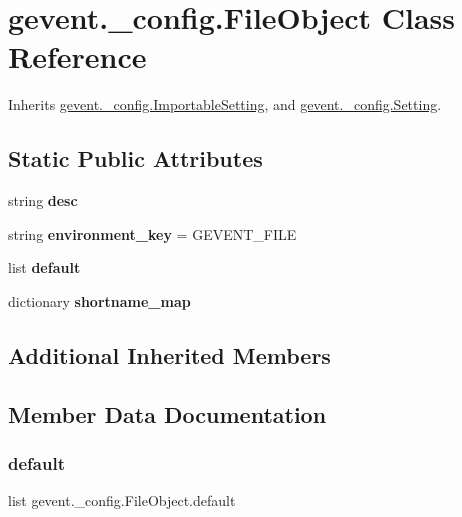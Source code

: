 \hypertarget{classgevent_1_1__config_1_1_file_object}{}\section{gevent.\+\_\+config.\+File\+Object Class Reference}
\label{classgevent_1_1__config_1_1_file_object}


Inherits \hyperlink{classgevent_1_1__config_1_1_importable_setting}{gevent.\+\_\+config.\+Importable\+Setting}, and \hyperlink{classgevent_1_1__config_1_1_setting}{gevent.\+\_\+config.\+Setting}.

\subsection*{Static Public Attributes}
\begin{DoxyCompactItemize}
\item 
string {\bfseries desc}
\item 
\mbox{\label{classgevent_1_1__config_1_1_file_object_a00bde1f1782d70e4623f906565fbb877}} 
string {\bfseries environment\+\_\+key} = \textquotesingle{}G\+E\+V\+E\+N\+T\+\_\+\+F\+I\+LE\textquotesingle{}
\item 
list {\bfseries default}
\item 
dictionary {\bfseries shortname\+\_\+map}
\end{DoxyCompactItemize}
\subsection*{Additional Inherited Members}


\subsection{Member Data Documentation}
\mbox{\label{classgevent_1_1__config_1_1_file_object_aef88355621466f434244602d3af8bc64}} 
\subsubsection{\texorpdfstring{default}{default}}
{\footnotesize\ttfamily list gevent.\+\_\+config.\+File\+Object.\+default\hspace{0.3cm}{\ttfamily [static]}}

